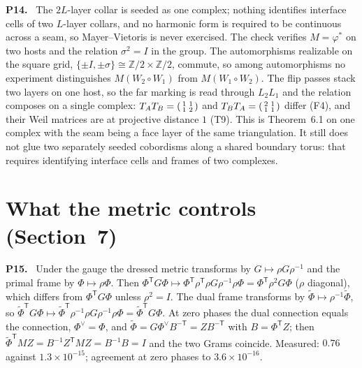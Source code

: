 \documentclass[11pt]{article}
\newcommand{\Z}{\mathbb{Z}}
\newenvironment{solution}[1]{\medskip\noindent\textbf{P#1.}\ }{\par\medskip}
\begin{document}
\begin{solution}{14}
The $2L$-layer collar is seeded as one complex; nothing identifies interface
cells of two $L$-layer collars, and no harmonic form is required to be
continuous across a seam, so Mayer--Vietoris is never exercised. The check
verifies $M=\varphi^*$ on two hosts and the relation $\sigma^2 = I$ in the
group. The automorphisms realizable on the square grid, $\{\pm I,\pm\sigma\}\cong\Z/2\times\Z/2$,
commute, so among automorphisms no experiment distinguishes $M(W_2\circ W_1)$
from $M(W_1\circ W_2)$. The flip passes stack two layers on one host, so the
far marking is read through $L_2L_1$ and the relation composes on a single
complex: $T_AT_B = \begin{psmallmatrix}1&1\\1&2\end{psmallmatrix}$ and
$T_BT_A = \begin{psmallmatrix}2&1\\1&1\end{psmallmatrix}$ differ (F4), and their
Weil matrices are at projective distance $1$ (T9). This is Theorem~6.1 on one
complex with the seam being a face layer of the same triangulation. It still
does not glue two separately seeded cobordisms along a shared boundary torus:
that requires identifying interface cells and frames of two complexes.
\end{solution}

\section*{What the metric controls (Section~7)}

\begin{solution}{15}
Under the gauge the dressed metric transforms by $G\mapsto\rho G\rho^{-1}$ and
the primal frame by $\Phi\mapsto\rho\Phi$. Then $\Phi^{\mathsf T}G\Phi\mapsto
\Phi^{\mathsf T}\rho^{\mathsf T}\rho G\rho^{-1}\rho\Phi = \Phi^{\mathsf T}\rho^2G\Phi$
($\rho$ diagonal), which differs from $\Phi^{\mathsf T}G\Phi$ unless $\rho^2=I$.
The dual frame transforms by $\tilde\Phi\mapsto\rho^{-1}\tilde\Phi$, so
$\tilde\Phi^{\mathsf T}G\Phi\mapsto\tilde\Phi^{\mathsf T}\rho^{-1}\rho G\rho^{-1}\rho\Phi
= \tilde\Phi^{\mathsf T}G\Phi$. At zero phases the dual connection equals the
connection, $\Phi^\vee = \Phi$, and $\tilde\Phi = G\Phi^\vee B^{-\mathsf T} = ZB^{-\mathsf T}$
with $B = \Phi^{\mathsf T}Z$; then $\tilde\Phi^{\mathsf T}MZ = B^{-1}Z^{\mathsf T}MZ = B^{-1}B = I$
and the two Grams coincide. Measured: $0.76$ against $1.3\times10^{-15}$;
agreement at zero phases to $3.6\times10^{-16}$.
\end{solution}
\end{document}

